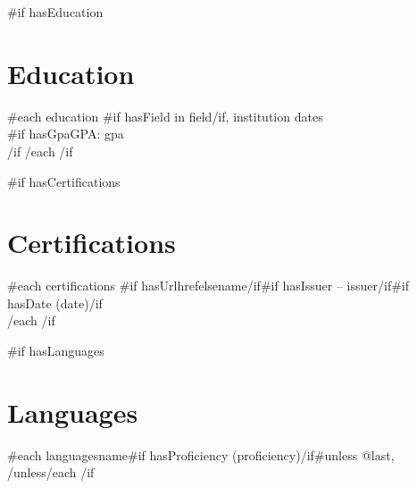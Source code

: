 \documentclass[10.5pt,a4paper]{article}
\begin{document}
{{#if hasEducation}}
\section{Education}
{{#each education}}
\textbf{\relax{}}{{#if hasField}} in {{field}}{{/if}}, {{institution}} \hfill {{dates}}\\
{{#if hasGpa}}GPA: {{gpa}}\\
{{/if}}
{{/each}}
{{/if}}

{{#if hasCertifications}}
\section{Certifications}
{{#each certifications}}
{{#if hasUrl}}{{href}}{{else}}{{name}}{{/if}}{{#if hasIssuer}} -- {{issuer}}{{/if}}{{#if hasDate}} ({{date}}){{/if}}\\
{{/each}}
{{/if}}

{{#if hasLanguages}}
\section{Languages}
{{#each languages}}{{name}}{{#if hasProficiency}} ({{proficiency}}){{/if}}{{#unless @last}}, {{/unless}}{{/each}}
{{/if}}
\end{document}
